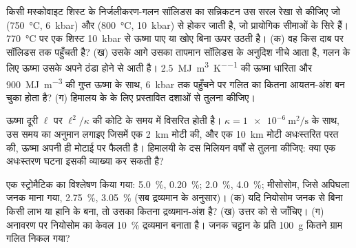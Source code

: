 \begin{exercise}[$\star\star\star$]\label{exo:b2:crustal-melting:10}
किसी मस्कोवाइट शिस्ट के निर्जलीकरण-गलन सॉलिडस का सन्निकटन उस सरल रेखा से कीजिए जो
(\qty{750}{\celsius}, \qty{6}{kbar}) और (\qty{800}{\celsius}, \qty{10}{kbar}) से होकर जाती है,
जो प्रायोगिक सीमाओं के सिरे हैं। \qty{770}{\celsius} पर एक शिस्ट
\qty{10}{kbar} से ऊष्मा पाए या खोए बिना ऊपर उठती है। (क) वह किस दाब पर
सॉलिडस तक पहुँचती है? (ख) उसके आगे उसका तापमान सॉलिडस के अनुदिश नीचे आता है, गलन के लिए ऊष्मा
उसके अपने ठंडा होने से आती है। \qty{2.5}{\mega\joule\per\cubic\metre\per\kelvin} की ऊष्मा धारिता
और \qty{900}{\mega\joule\per\cubic\metre} की गुप्त ऊष्मा के साथ, \qty{6}{kbar} तक पहुँचने पर गलित का
कितना आयतन-अंश बन चुका होता है? (ग) हिमालय के  के लिए प्रस्तावित दशाओं से
तुलना कीजिए।
\end{exercise}

\begin{exercise}[$\star\star\star$]\label{exo:b2:crustal-melting:11}
ऊष्मा दूरी $\ell$ पर $\ell^2/\kappa$ की कोटि के समय में विसरित होती है।
$\kappa = \qty{1e-6}{\square\metre\per\second}$ के साथ, उस समय का अनुमान लगाइए जिसमें एक
\qty{2}{km} मोटी  की, और एक \qty{10}{km} मोटी अधःस्तरित परत की, ऊष्मा अपनी
ही मोटाई पर फैलती है। हिमालयी  के दस मिलियन वर्षों से तुलना कीजिए: क्या एक
अधःस्तरण घटना इसकी व्याख्या कर सकती है?
\end{exercise}

\begin{exercise}[$\star\star\star$]\label{exo:b2:crustal-melting:12}
एक स्ट्रोमैटिक  का विश्लेषण किया गया:   \qty{5.0}{\percent}, 
\qty{0.20}{\percent};   \qty{2.0}{\percent}, 
\qty{4.0}{\percent}; मीसोसोम, जिसे अपिघला जनक माना गया, 
\qty{2.75}{\percent},  \qty{3.05}{\percent} (सब द्रव्यमान के अनुसार)। (क) यदि
नियोसोम जनक से बिना किसी लाभ या हानि के बना, तो उसका कितना द्रव्यमान-अंश
 है? (ख) उत्तर को  से जाँचिए। (ग) अनावरण पर  नियोसोम का केवल
\qty{10}{\percent} द्रव्यमान बनाता है। जनक चट्टान के प्रति
\qty{100}{\gram} कितने ग्राम गलित निकल गया?
\end{exercise}

